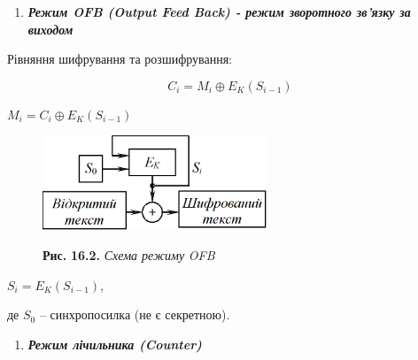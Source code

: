 \documentclass[a4paper]{article}
\newcounter{saveenum}
\newcommand\liststyleWWviiiNumxxi{%
\renewcommand\theenumi{\arabic{enumi}}
\renewcommand\theenumii{\arabic{enumii}}
\renewcommand\theenumiii{\arabic{enumiii}}
\renewcommand\theenumiv{\arabic{enumiv}}
\renewcommand\labelenumi{\theenumi.}
\renewcommand\labelenumii{\theenumii.}
\renewcommand\labelenumiii{\theenumiii.}
\renewcommand\labelenumiv{\theenumiv.}
}
\newcounter{}
\begin{document}
\bigskip


\bigskip


\bigskip


\bigskip


\bigskip


\bigskip


\bigskip

\liststyleWWviiiNumxxi
\setcounter{saveenum}{\value{enumi}}
\begin{enumerate}
\setcounter{enumi}{\value{saveenum}}
\item {\centering\bfseries\itshape
Режим OFB (Output Feed Back) - режим зворотного зв’язку за виходом
\par}
\end{enumerate}

\bigskip


\bigskip

Рівняння шифрування та розшифрування:

\begin{equation*}
{C_{{i}}=M_{{i}}{\oplus}E_{{K}}(S_{{i-1}})}
\end{equation*}
{\centering  ${M_{{i}}=C_{{i}}{\oplus}E_{{K}}(S_{{i-1}})}$\par}

\begin{figure}
\centering
\begin{minipage}{2.7689in}
 \includegraphics[width=2.6425in,height=1.1146in]{crypt-img/crypt-img338.png} 

{\centering
\textbf{Рис. }\textbf{16}\textbf{.2.} \textit{Схема режим}\textit{у}\textit{
}\textit{OFB}
\par}
\end{minipage}
\end{figure}
{\centering
 ${S_{{i}}=E_{{K}}(S_{{i-1}})}$,
\par}

де  ${S_{{0}}}$ – синхропосилка (не є секретною).


\bigskip


\bigskip

\liststyleWWviiiNumxxi
\setcounter{saveenum}{\value{enumi}}
\begin{enumerate}
\setcounter{enumi}{\value{saveenum}}
\item {\centering\bfseries\itshape
Режим лічильника (Counter)
\par}
\end{enumerate}
{\centering \par}
\end{document}
